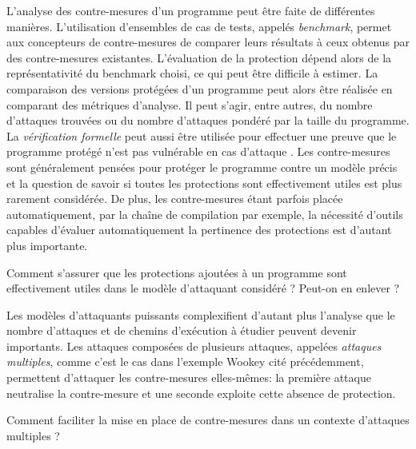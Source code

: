         L'analyse des contre-mesures d'un programme peut être faite de différentes manières. L'utilisation d'ensembles de cas de tests, appelés \textit{benchmark}, permet aux concepteurs de contre-mesures de comparer leurs résultats à ceux obtenus par des contre-mesures existantes. L'évaluation de la protection dépend alors de la représentativité du benchmark choisi, ce qui peut être difficile à estimer. 
        La comparaison des versions protégées d'un programme peut alors être réalisée en comparant des métriques d'analyse. Il peut s'agir, entre autres, du nombre d'attaques trouvées ou du nombre d'attaques pondéré par la taille du programme. 
        La \textit{vérification formelle} peut aussi être utilisée pour effectuer une preuve que le programme protégé n'est pas vulnérable en cas d'attaque \cite{Rauzy/CE14, Moro/JCE14}.
        Les contre-mesures sont généralement pensées pour protéger le programme contre un modèle précis et la question de savoir si toutes les protections sont effectivement utiles est plus rarement considérée. 
        De plus, les contre-mesures étant parfois placée automatiquement, par la chaîne de compilation par exemple, la nécessité d'outils capables d'évaluer automatiquement la pertinence des protections est d'autant plus importante.
        
        \begin{probl}
            \label{prob:cm-effective}
            Comment s'assurer que les protections ajoutées à un programme sont effectivement utiles dans le modèle d'attaquant considéré ? Peut-on en enlever ?
        \end{probl}

        \begin{sloppypar}
        Les modèles d'attaquants puissants complexifient d'autant plus l'analyse que le nombre d'attaques et de chemins d'exécution à étudier peuvent devenir importants. Les attaques composées de plusieurs attaques, appelées \textit{attaques multiples}, comme c'est le cas dans l'exemple Wookey \cite{inter_cesti} cité précédemment, permettent d'attaquer les contre-mesures elles-mêmes: la première attaque neutralise la contre-mesure et une seconde exploite cette absence de protection.
        \end{sloppypar}
        
        \begin{probl}
            \label{prob:cm-multi-fault}
            Comment faciliter la mise en place de contre-mesures dans un contexte d'attaques multiples ?
        \end{probl}
            
